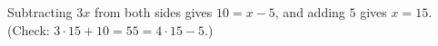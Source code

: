 Subtracting $3x$ from both sides gives $10=x-5$, and adding $5$ gives $x=\boxed{15}$. (Check: $3\cdot15+10=55=4\cdot15-5$.)
